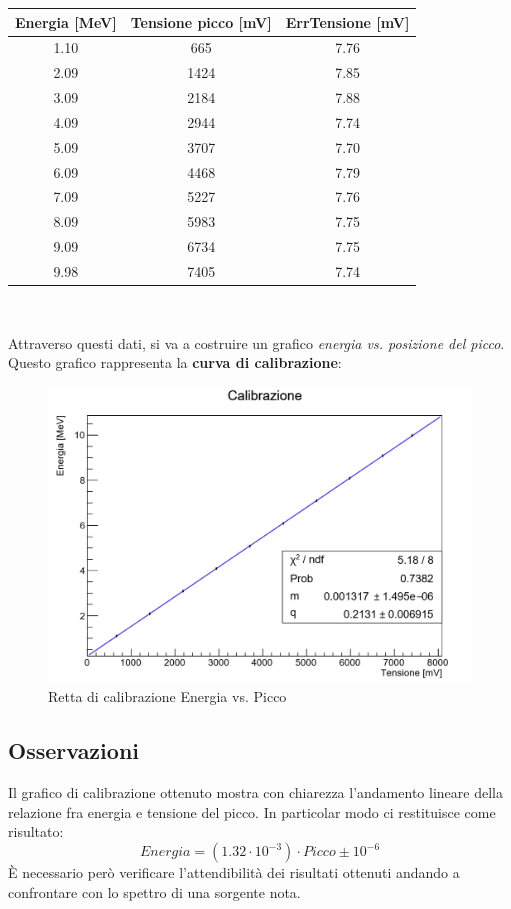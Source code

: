 \documentclass[a4paper,10pt]{article}
\begin{document}
\begin{center}
\begin{tabular}{ccc}
\toprule
Energia [MeV] & Tensione picco [mV] & ErrTensione [mV]\\
\midrule
1.10 & 665 & 7.76\\
2.09 & 1424 & 7.85\\
3.09 & 2184 & 7.88\\
4.09 & 2944 & 7.74\\
5.09 & 3707 & 7.70\\
6.09 & 4468 & 7.79\\
7.09 & 5227 & 7.76\\
8.09 & 5983 & 7.75\\
9.09 & 6734 & 7.75\\
9.98 & 7405 & 7.74\\
\bottomrule
\end{tabular}\\
\end{center}

Attraverso questi dati, si va a costruire un grafico \textit{energia vs. posizione del picco}. Questo grafico rappresenta la \textbf{curva di calibrazione}:\\

\begin{figure}[h!]
\centering
\includegraphics[scale=0.5]{rettacalibrazione.jpg}
\caption{Retta di calibrazione Energia vs. Picco}
\end{figure}

\subsection{Osservazioni}
Il grafico di calibrazione ottenuto mostra con chiarezza l'andamento lineare della relazione fra energia e tensione del picco. In particolar modo ci restituisce come risultato: 
\[
Energia = (1.32\cdot10^{-3})\cdot Picco \pm 10^{-6}
\]
\`E necessario però verificare l'attendibilit\`a dei risultati ottenuti andando a confrontare con lo spettro di una sorgente nota.
\end{document}
